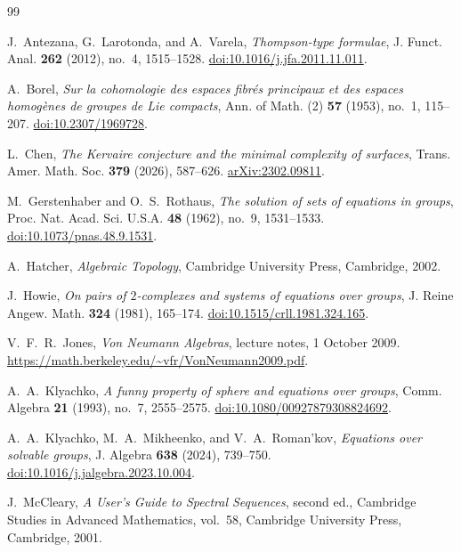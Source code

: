 \begin{thebibliography}{99}

J.~Antezana, G.~Larotonda, and A.~Varela,
\emph{Thompson-type formulae},
J. Funct. Anal. \textbf{262} (2012), no.~4, 1515--1528.
\href{https://doi.org/10.1016/j.jfa.2011.11.011}{doi:10.1016/j.jfa.2011.11.011}.

A.~Borel,
\emph{Sur la cohomologie des espaces fibr\'es principaux et des espaces
homog\`enes de groupes de Lie compacts},
Ann. of Math. (2) \textbf{57} (1953), no.~1, 115--207.
\href{https://doi.org/10.2307/1969728}{doi:10.2307/1969728}.

L.~Chen,
\emph{The Kervaire conjecture and the minimal complexity of surfaces},
Trans. Amer. Math. Soc. \textbf{379} (2026), 587--626.
\href{https://arxiv.org/abs/2302.09811}{arXiv:2302.09811}.

M.~Gerstenhaber and O.~S.~Rothaus,
\emph{The solution of sets of equations in groups},
Proc. Nat. Acad. Sci. U.S.A. \textbf{48} (1962), no.~9, 1531--1533.
\href{https://doi.org/10.1073/pnas.48.9.1531}{doi:10.1073/pnas.48.9.1531}.

A.~Hatcher,
\emph{Algebraic Topology},
Cambridge University Press, Cambridge, 2002.

J.~Howie,
\emph{On pairs of $2$-complexes and systems of equations over groups},
J. Reine Angew. Math. \textbf{324} (1981), 165--174.
\href{https://doi.org/10.1515/crll.1981.324.165}{doi:10.1515/crll.1981.324.165}.

V.~F.~R.~Jones,
\emph{Von Neumann Algebras},
lecture notes, 1 October 2009.
\url{https://math.berkeley.edu/~vfr/VonNeumann2009.pdf}.

A.~A.~Klyachko,
\emph{A funny property of sphere and equations over groups},
Comm. Algebra \textbf{21} (1993), no.~7, 2555--2575.
\href{https://doi.org/10.1080/00927879308824692}{doi:10.1080/00927879308824692}.

A.~A.~Klyachko, M.~A.~Mikheenko, and V.~A.~Roman'kov,
\emph{Equations over solvable groups},
J. Algebra \textbf{638} (2024), 739--750.
\href{https://doi.org/10.1016/j.jalgebra.2023.10.004}{doi:10.1016/j.jalgebra.2023.10.004}.

J.~McCleary,
\emph{A User's Guide to Spectral Sequences},
second ed., Cambridge Studies in Advanced Mathematics, vol.~58,
Cambridge University Press, Cambridge, 2001.


\end{thebibliography}
